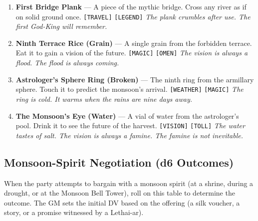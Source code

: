 \begin{enumerate}
  \hfill \textit{The spirit will come. It will demand an offering. The offering must be a promise.}
\item[J] \textbf{First Bridge Plank} --- A piece of the mythic bridge. Cross any river as if on solid ground once. \texttt{[TRAVEL]} \texttt{[LEGEND]}
  \hfill \textit{The plank crumbles after use. The first God-King will remember.}
\item[Q] \textbf{Ninth Terrace Rice (Grain)} --- A single grain from the forbidden terrace. Eat it to gain a vision of the future. \texttt{[MAGIC]} \texttt{[OMEN]}
  \hfill \textit{The vision is always a flood. The flood is always coming.}
\item[K] \textbf{Astrologer's Sphere Ring (Broken)} --- The ninth ring from the armillary sphere. Touch it to predict the monsoon's arrival. \texttt{[WEATHER]} \texttt{[MAGIC]}
  \hfill \textit{The ring is cold. It warms when the rains are nine days away.}
\item[A] \textbf{The Monsoon's Eye (Water)} --- A vial of water from the astrologer's pool. Drink it to see the future of the harvest. \texttt{[VISION]} \texttt{[TOLL]}
  \hfill \textit{The water tastes of salt. The vision is always a famine. The famine is not inevitable.}
\end{enumerate}


\subsection*{Monsoon-Spirit Negotiation (d6 Outcomes)}
\label{sec:ayokha-monsoon-spirit}

When the party attempts to bargain with a monsoon spirit (at a shrine, during a drought, or at the Monsoon Bell Tower), roll on this table to determine the outcome. The GM sets the initial DV based on the offering (a silk voucher, a story, or a promise witnessed by a Lethai-ar).


